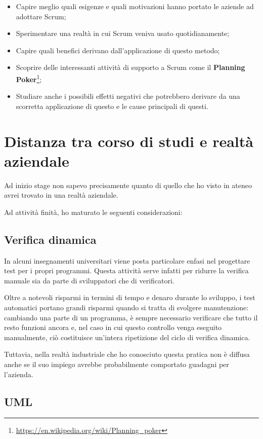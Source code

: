 \begin{itemize}
\item Capire meglio quali esigenze e quali motivazioni hanno portato le aziende
  ad adottare Scrum;
\item Sperimentare una realtà in cui Scrum veniva usato quotidianamente;
\item Capire quali benefici derivano dall'applicazione di questo metodo;
\item Scoprire delle interessanti attività di supporto a Scrum come il
  \textbf{Planning
  Poker}\footnote{\url{https://en.wikipedia.org/wiki/Planning_poker}};
\item Studiare anche i possibili effetti negativi che potrebbero derivare da
  una scorretta applicazione di questo e le cause principali di questi.
\end{itemize}

\section{Distanza tra corso di studi e realtà aziendale}

Ad inizio stage non sapevo precisamente quanto di quello che ho visto in ateneo
avrei trovato in una realtà aziendale.

Ad attività finità, ho maturato le seguenti considerazioni:

\subsection{Verifica dinamica}

In alcuni insegnamenti universitari viene posta particolare enfasi nel
progettare test per i propri programmi.
Questa attività serve infatti per ridurre la verifica manuale sia da parte di
sviluppatori che di verificatori.

Oltre a notevoli risparmi in termini di tempo e denaro durante lo sviluppo, i
test automatici portano grandi risparmi quando si tratta di svolgere
manutenzione: cambiando una parte di un programma, è sempre necessario
verificare che tutto il resto funzioni ancora e, nel caso in cui questo
controllo venga eseguito manualmente, ciò costituisce un'intera ripetizione del
ciclo di verifica dinamica.

Tuttavia, nella realtà industriale che ho conosciuto questa pratica non è
diffusa anche se il suo impiego avrebbe probabilmente comportato guadagni per
l'azienda.

\subsection{UML}

